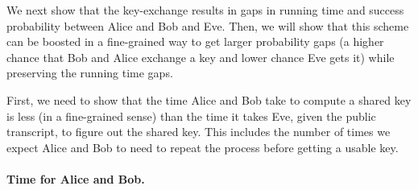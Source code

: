 
We next show that the key-exchange results in gaps in running time and success probability between Alice and Bob and Eve. Then, we will show that this scheme can be boosted in a fine-grained way to get larger probability gaps (a higher chance that Bob and Alice exchange a key and lower chance Eve gets it) while preserving the running time gaps. 

First, we need to show that the time Alice and Bob take to compute a shared key is less (in a fine-grained sense) than the time it takes Eve, given the public transcript, to figure out the shared key. This includes the number of times we expect Alice and Bob to need to repeat the process before getting a usable key.

\paragraph{Time for Alice and Bob.}

